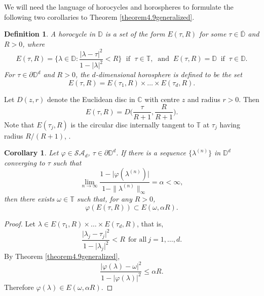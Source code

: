 \documentclass[11pt, reqno]{amsart}
\newtheorem{corollary}[theorem]{Corollary}
\newtheorem{definition}[theorem]{Definition}
\newcommand\1{\boldsymbol {1}}
\numberwithin{equation}{section}
\begin{document}
We will need the language of horocycles and horospheres to formulate the following two corollaries to Theorem \ref{theorem4.9generalized}.
\begin{definition}{}\label{horocycle}
A {\em{horocycle}} in $\mathbb{D}$ is a set of the form $E(\tau,R)$ for some $\tau\in \overline{\mathbb{D}}$ and $R>0$, where 
$$E(\tau,R)=\bigg\{\lambda\in\mathbb{D}:\dfrac{\lvert \lambda-\tau\rvert^{2}}{1-\lvert\lambda\rvert^{2}}<R\bigg\}
\; \text{ if } \; \tau \in \mathbb{T}, \;\; \text{and} \; \;  E(\tau,R)=\mathbb{D} \; \;
\text{if} \;\; \tau \in \mathbb{D}.$$
For $\tau\in \partial\mathbb{D}^{d}$ and $R>0$, the $d$-dimensional {\em{horosphere}} is defined to be the set 
$$E(\tau,R)=E(\tau_{1},R)\times \hdots \times E(\tau_{d},R).$$
\end{definition}
Let $D(z,r)$ denote the Euclidean disc in $\mathbb{C}$ with centre $z$ and radius $r>0$. Then
\begin{equation}\label{horocycleequaltoadisc}
E(\tau,R)=D\bigg(\dfrac{\tau}{R+1},\dfrac{R}{R+1}\bigg).
\end{equation}
Note that $E(\tau_{j},R)$ is the circular disc internally tangent to $\mathbb{T}$ at $\tau_{j}$ having radius $R/(R+1)$, \cite[Section 4]{AMYcara}.

\begin{corollary}\label{horocyclecorollary}
Let $\varphi\in\mathcal{SA}_{d}$, $\tau\in\partial\mathbb{D}^{d}$. If there is a sequence $\{\lambda^{(n)}\}$ in $\mathbb{D}^{d}$ converging to $\tau$ such that
$$\lim_{n\rightarrow \infty}\dfrac{1-\lvert \varphi(\lambda^{(n)})\rvert}{1-\|\lambda^{(n)}\|_{\infty}}=\alpha<\infty,$$
then there exists $\omega\in\mathbb{T}$ such that, for any $R>0$, 
$$\varphi(E(\tau,R))\subset E(\omega,\alpha R).$$
\end{corollary}
\begin{proof}
    Let $\lambda\in E(\tau_{1},R)\times\hdots\times E(\tau_{d},R)$, that is, 
$$\dfrac{\lvert \lambda_{j}-\tau_{j}\rvert^{2}}{1-\lvert\lambda_{j}\rvert^{2}}<R~~\text{for all}~j=1,\hdots,d.$$
By Theorem \ref{theorem4.9generalized}, 
$$\dfrac{\lvert \varphi(\lambda)-\omega\rvert^{2}}{1-\lvert \varphi(\lambda)\rvert^{2}}\leq \alpha R.$$
Therefore $\varphi(\lambda)\in E(\omega,\alpha R)$.\end{proof}
\end{document}

